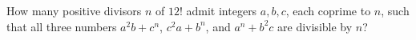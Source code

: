How many positive divisors $n$ of $12!$ admit integers $a,b,c$, each coprime to $n$, such that all three numbers $a^2b+c^n$, $c^2a+b^n$, and $a^n+b^2c$ are divisible by $n$?
